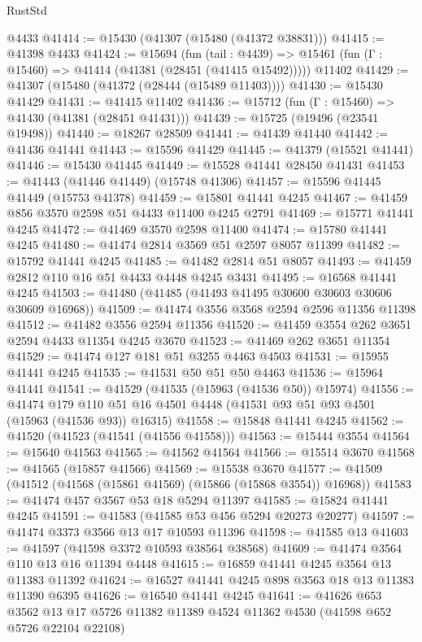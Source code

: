 \begin{lexlean}{RustStd}
\begin{coremodule}
{\begin{coremodule}
{{{{{{{{{{{{{{{{{{{{{{{{{{{{{{{{{{{{{{{{{{{{{{{{{{{{{{{{{{{{    @4433
@41414 := @15430 (@41307 (@15480 (@41372 @38831)))
@41415 := @41398 @4433
@41424 := @15694
    (fun (tail : @4439) => @15461 (fun (Γ : @15460) => @41414 (@41381 (@28451 (@41415 @15492)))))
    @11402
@41429 := @41307 (@15480 (@41372 (@28444 (@15489 @11403))))
@41430 := @15430 @41429
@41431 := @41415 @11402
@41436 := @15712 (fun (Γ : @15460) => @41430 (@41381 (@28451 @41431)))
@41439 := @15725 (@19496 (@23541 @19498))
@41440 := @18267 @28509
@41441 := @41439 @41440
@41442 := @41436 @41441
@41443 := @15596 @41429
@41445 := @41379 (@15521 @41441)
@41446 := @15430 @41445
@41449 := @15528 @41441 @28450 @41431
@41453 := @41443 (@41446 @41449) (@15748 @41306)
@41457 := @15596 @41445 @41449 (@15753 @41378)
@41459 := @15801 @41441 @4245
@41467 := @41459 @856 @3570 @2598 @51 @4433 @11400 @4245 @2791
@41469 := @15771 @41441 @4245
@41472 := @41469 @3570 @2598 @11400
@41474 := @15780 @41441 @4245
@41480 := @41474 @2814 @3569 @51 @2597 @8057 @11399
@41482 := @15792 @41441 @4245
@41485 := @41482 @2814 @51 @8057
@41493 := @41459 @2812 @110 @16 @51 @4433 @4448 @4245 @3431
@41495 := @16568 @41441 @4245
@41503 := @41480 (@41485 (@41493 @41495 @30600 @30603 @30606 @30609 @16968))
@41509 := @41474 @3556 @3568 @2594 @2596 @11356 @11398
@41512 := @41482 @3556 @2594 @11356
@41520 := @41459 @3554 @262 @3651 @2594 @4433 @11354 @4245 @3670
@41523 := @41469 @262 @3651 @11354
@41529 := @41474 @127 @181 @51 @3255 @4463 @4503
@41531 := @15955 @41441 @4245
@41535 := @41531 @50 @51 @50 @4463
@41536 := @15964 @41441
@41541 := @41529 (@41535 (@15963 (@41536 @50)) @15974)
@41556 := @41474
    @179
    @110
    @51
    @16
    @4501
    @4448
    (@41531 @93 @51 @93 @4501 (@15963 (@41536 @93)) @16315)
@41558 := @15848 @41441 @4245
@41562 := @41520 (@41523 (@41541 (@41556 @41558)))
@41563 := @15444 @3554
@41564 := @15640 @41563
@41565 := @41562 @41564
@41566 := @15514 @3670
@41568 := @41565 (@15857 @41566)
@41569 := @15538 @3670
@41577 := @41509 (@41512 (@41568 (@15861 @41569) (@15866 (@15868 @3554)) @16968))
@41583 := @41474 @457 @3567 @53 @18 @5294 @11397
@41585 := @15824 @41441 @4245
@41591 := @41583 (@41585 @53 @456 @5294 @20273 @20277)
@41597 := @41474 @3373 @3566 @13 @17 @10593 @11396
@41598 := @41585 @13
@41603 := @41597 (@41598 @3372 @10593 @38564 @38568)
@41609 := @41474 @3564 @110 @13 @16 @11394 @4448
@41615 := @16859 @41441 @4245 @3564 @13 @11383 @11392
@41624 := @16527 @41441 @4245 @898 @3563 @18 @13 @11383 @11390 @6395
@41626 := @16540 @41441 @4245
@41641 := @41626
    @653
    @3562
    @13
    @17
    @5726
    @11382
    @11389
    @4524
    @11362
    @4530
    (@41598 @652 @5726 @22104 @22108)
}}}}}}}}}}}}}}}}}}}}}}}}}}}}}}}}}}}}}}}}}}}}}}}}}}}}}}}}}}}}
\end{coremodule}}
\end{coremodule}
\end{lexlean}
